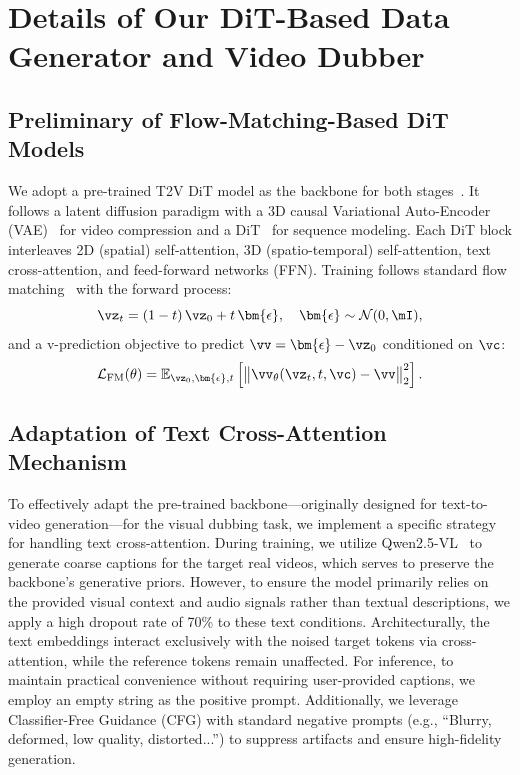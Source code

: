 





\section{Details of Our DiT-Based Data Generator and Video Dubber}

\subsection{Preliminary of Flow-Matching-Based DiT Models}
\label{appendix_sec:preliminary}
We adopt a pre-trained T2V DiT model as the backbone for both stages~\citep{hong2022cogvideo,kong2024hunyuanvideo,wan2025wan}.
It follows a latent diffusion paradigm with a 3D causal Variational Auto-Encoder (VAE)~\citep{kingma2013vae} for video compression and a DiT~\citep{peebles2023dit} for sequence modeling. 
Each DiT block interleaves 2D (spatial) self-attention, 3D (spatio-temporal) self-attention, text cross-attention, and feed-forward networks (FFN). 
Training follows standard flow matching~\citep{esser2024sd3,lipman2022flow} with the forward process:
\begin{equation}
    \vz_t = (1-t)\,\vz_0 + t\,\bm{\epsilon}, 
    \quad \bm{\epsilon} \sim \mathcal{N}(0, \mI),
\label{eq:flow_matching_forward}
\end{equation}
and a v-prediction objective to predict $\vv=\bm{\epsilon}-\vz_0$ conditioned on $\vc$:
\begin{equation}
    \mathcal{L}_{\text{FM}}(\theta) 
    = \mathbb{E}_{\vz_0, \bm{\epsilon}, t} 
    \left[ \big\| \vv_\theta(\vz_t, t, \vc) - \vv \big\|_2^2 \right].
\label{eq:flow_matching_loss}
\end{equation}


\subsection{Adaptation of Text Cross-Attention Mechanism}
To effectively adapt the pre-trained backbone—originally designed for text-to-video generation—for the visual dubbing task, we implement a specific strategy for handling text cross-attention. During training, we utilize Qwen2.5-VL~\cite{bai2025qwen2} to generate coarse captions for the target real videos, which serves to preserve the backbone's generative priors. However, to ensure the model primarily relies on the provided visual context and audio signals rather than textual descriptions, we apply a high dropout rate of 70\% to these text conditions. Architecturally, the text embeddings interact exclusively with the noised target tokens via cross-attention, while the reference tokens remain unaffected. For inference, to maintain practical convenience without requiring user-provided captions, we employ an empty string as the positive prompt. Additionally, we leverage Classifier-Free Guidance (CFG) with standard negative prompts (e.g., ``Blurry, deformed, low quality, distorted...'') to suppress artifacts and ensure high-fidelity generation.




